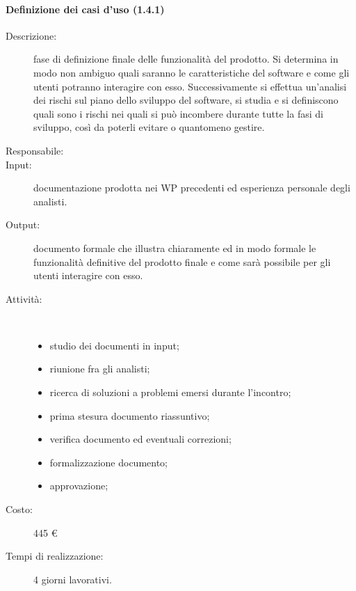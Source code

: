 \begin{description}
\paragraph{Definizione dei casi d'uso (1.4.1)}
\begin{description}
\item[Descrizione:]fase di definizione finale delle funzionalit\`{a} del prodotto. Si determina in modo non ambiguo quali saranno le caratteristiche del software e come gli utenti potranno interagire con esso. Successivamente si effettua un'analisi dei rischi sul piano dello sviluppo del software, si studia e si definiscono quali sono i rischi nei quali si pu\`{o} incombere durante tutte la fasi di sviluppo, cos\`{i} da poterli evitare o quantomeno gestire.
\item[Responsabile:] 
\item[Input: ]documentazione prodotta nei WP precedenti ed esperienza personale degli analisti.
\item[Output:] documento formale che illustra chiaramente ed in modo formale le funzionalità definitive del prodotto finale e come sarà possibile per gli utenti interagire con esso.
\item[Attività:]\mbox{}\\[-1.5\baselineskip]
	\begin{itemize}
	\item studio dei documenti in input;
	\item riunione fra gli analisti;
	\item ricerca di soluzioni a problemi emersi durante l'incontro;
	\item prima stesura documento riassuntivo;
	\item verifica documento ed eventuali correzioni;
	\item formalizzazione documento;
	\item approvazione;
	\end{itemize}
\item[Costo:] 445 \euro{}
\item[Tempi di realizzazione:] 4 giorni lavorativi.
\end{description}


\end{description}
